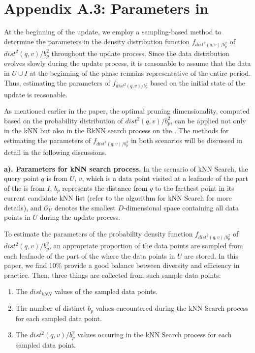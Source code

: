 \section*{Appendix A.3: Parameters in }
 At the beginning of the update, we employ a sampling-based method to determine the parameters in the density distribution function $f_{dist^2(q,v)/b_{p}^2}$ of $dist^2(q,v)/b_{p}^2$ throughout the update process. Since the data distribution evolves slowly during the update process, it is reasonable to assume that the data in $U\cup I$ at the beginning of the phase remains representative of the entire period. Thus, estimating the parameters of $f_{dist^2(q,v)/b^2_{p}}$ based on the initial state of the update is reasonable.

As mentioned earlier in the paper, the optimal pruning dimensionality, computed based on the probability distribution of $dist^2(q,v)/b_{p}^2$, can be applied not only in the kNN but also in the RkNN search process on the \dualtree. The methods for estimating the parameters of $f_{dist^2(q,v)/b_{p}^2}$ in both scenarios will be discussed in detail in the following discussions.

\noindent\textbf{ a). Parameters for kNN search process.}
In the scenario of kNN Search, the query point $q$ is from $U$, $v$, which is a data point visited at a leafnode of the \deltatree part of the \dualtree is from $I$, $b_p$ represents the distance from $q$ to the farthest point in its current candidate kNN list (refer to the algorithm for kNN Search for more details), and $\mathcal{O}_U$ denotes the smallest $D$-dimensional space containing all data points in $U$ during the update process. 

To estimate the parameters of the probability density function $f_{dist^2(q,v)/b^2_p}$ of $dist^2(q,v)/b^2_p$, an appropriate proportion of the data points are sampled from each leafnode of the \hdrtree part of the \dualtree where the data points in $U$ are stored. In this paper, we find 10\% provide a good balance between diversity and efficiency in practice. Then, three things are collected from such sample data points:
\begin{enumerate}
    \item The $dist_{kNN}$ values of the sampled data points.
    \item The number of distinct $b_p$ values encountered during the kNN Search process for each sampled data point.
    \item The $dist^2(q,v)/b_{p}^2$ values occuring in the kNN Search process for each sampled data point.  
\end{enumerate}

